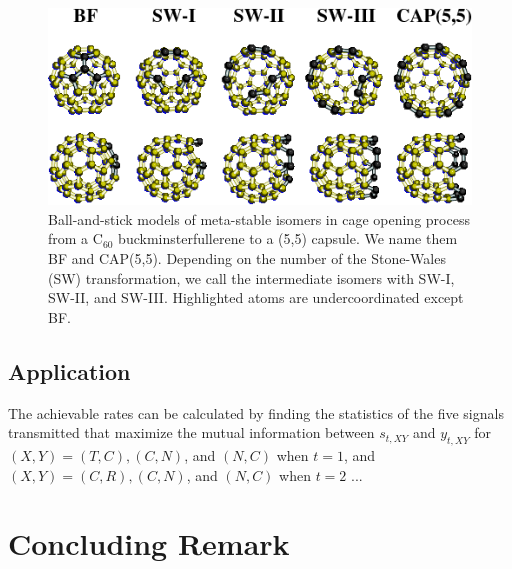 \documentclass[master,english,final]{kaist-ucs}
\begin{document}
	\begin{figure}[t]
		\centerline{\includegraphics[width=12.5cm]{sample-fig1}}
		\caption[Enter the caption title here]{ Ball-and-stick models of meta-stable isomers in
			cage opening process from a C$_{60}$ buckminsterfullerene
			to a (5,5) capsule. We name them BF and CAP(5,5).
			Depending on the number of the Stone-Wales (SW) transformation,
			we call the intermediate isomers with SW-I, SW-II, and SW-III.
			Highlighted atoms are undercoordinated except BF.
		} \label{mag-fig1}
	\end{figure}

	\section{Application}

	The achievable rates can be calculated by finding the statistics of the five signals transmitted that maximize the mutual information between $s_{t,XY}$ and $y_{t,XY}$ for $(X,Y)=(T,C), (C,N)$, and $(N,C)$ when $t=1$, and $(X,Y)=(C,R), (C,N)$, and $(N,C)$ when $t=2$ \cite{SOCA2,EF2}...


	\chapter{Concluding Remark}
\end{document}
